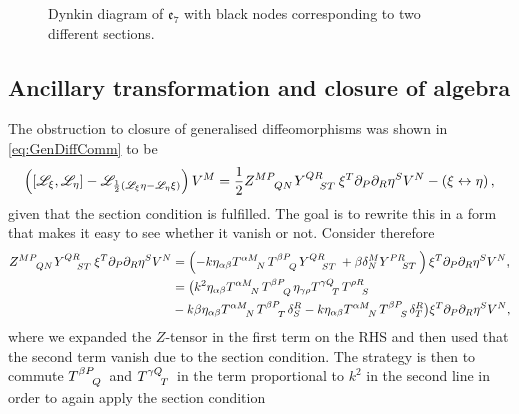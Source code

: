 \begin{figure}
    \caption{Dynkin diagram of $\mathfrak{e}_7$ with black nodes corresponding to two different sections.}
    \label{fig:E7WithSection}
\end{figure}



\subsection{Ancillary transformation and closure of algebra\label{sec:AncillaryTransformationsAndClosure}}
The obstruction to closure of generalised diffeomorphisms was shown in \eqref{eq:GenDiffComm} to be  
\begin{equation}\label{eq:GenDiffComm2}
    \left(\left[\mathscr{L}_\xi,\mathscr{L}_\eta\right]-\mathscr{L}_{\frac{1}{2}\left(\mathscr{L}_\xi\eta-\mathscr{L}_\eta\xi\right)}\right)V^M = \frac{1}{2}\tensor{Z}{^{MP}_{QN}}\tensor{Y}{^{QR}_{ST}}\xi^T\pd_P\pd_R\eta^SV^N-\left(\xi\leftrightarrow\eta\right),
\end{equation}
given that the section condition is fulfilled. The goal is to rewrite this in a form that makes it easy to see whether it vanish or not. Consider therefore
\begin{equation}\label{eq:RemainderTermGauge}
    \begin{aligned}
        \tensor{Z}{^{MP}_{QN}}\tensor{Y}{^{QR}_{ST}}\xi^T\pd_P\pd_R\eta^SV^N &= \left(-k\eta_{\alpha\beta}\tensor{T}{^{\alpha M}_N}\tensor{T}{^{\beta P}_Q}\tensor{Y}{^{QR}_{ST}}+\beta \delta^M_N\tensor{Y}{^{PR}_{ST}}\right)\xi^T\pd_P\pd_R\eta^SV^N,\\
        &= \big(k^2\eta_{\alpha\beta}\tensor{T}{^{\alpha M}_N}\tensor{T}{^{\beta P}_Q}\eta_{\gamma\rho}\tensor{T}{^{\gamma Q}_T}\tensor{T}{^{\rho R}_S}\\
        &-k\beta\eta_{\alpha\beta}\tensor{T}{^{\alpha M}_N}\tensor{T}{^{\beta P}_T}\delta^R_S-k\eta_{\alpha\beta}\tensor{T}{^{\alpha M}_N}\tensor{T}{^{\beta P}_S}\delta^{R}_T\big)\xi^T\pd_P\pd_R\eta^SV^N,
    \end{aligned}
\end{equation}
where we expanded the $Z$-tensor in the first term on the RHS and then used that the second term vanish due to the section condition. The strategy is then to commute $\tensor{T}{^{\beta P}_Q}$ and $\tensor{T}{^{\gamma Q}_T}$ in the term proportional to $k^2$ in the second line in order to again apply the section condition
